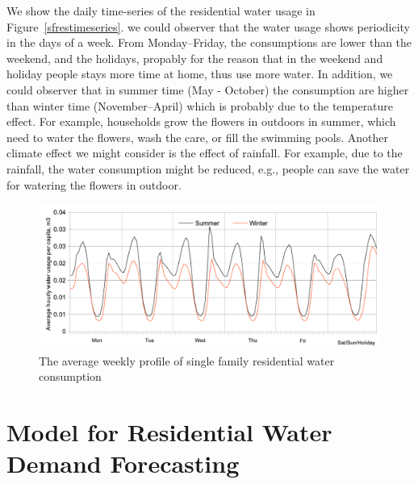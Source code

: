 \documentclass[a4paper,12pt]{llncs}
\newcommand{\eg}{e.g.}
\begin{document}
We show the daily time-series of the residential water usage in Figure~\ref{sfrestimeseries}. we could observer that the water usage shows periodicity in the days of a week. From Monday--Friday, the consumptions are lower than the weekend, and the holidays, propably for the reason that in the weekend and holiday people stays more time at home, thus use more water. In addition, we could observer that in summer time (May - October) the consumption are higher than winter time (November--April) which is probably due to the temperature effect. For example,  households grow the flowers in outdoors in summer, which need to water the flowers,  wash the care, or fill the swimming pools. Another climate effect we might consider is the effect of rainfall. For example, due to the rainfall, the water consumption might be reduced, \eg, people can save the water for watering the flowers in outdoor.


\begin{figure}[htp]
\centering
\includegraphics[width=1\textwidth]{images/avgweeklyprofile}
\caption{The average weekly profile of single family residential water consumption}
\label{fig:dailyprofile}
\end{figure}



\section{Model for Residential Water Demand Forecasting}
\end{document}
